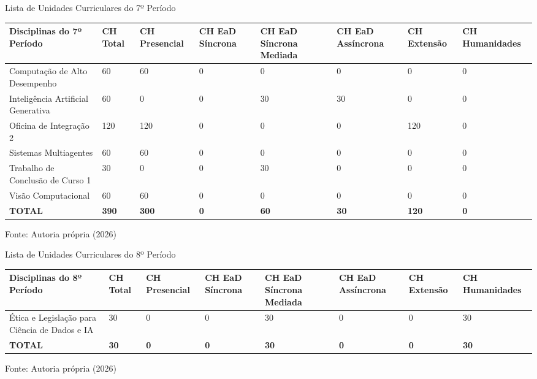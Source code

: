 \begin{quadro}[ht!]
\centering
\caption{Lista de Unidades Curriculares do 7º Período}
\label{quadro2.7}
\small
\begin{tabular}{|p{4.2cm}|p{1.2cm}|p{1.2cm}|p{1.2cm}|p{1.2cm}|p{1.2cm}|p{1.2cm}|p{1.2cm}|}
\hline
\rowcolor{gray!10} \textbf{Disciplinas do 7º Período} & \textbf{CH Total} & \textbf{CH Presencial} & \textbf{CH EaD Síncrona} & \textbf{CH EaD Síncrona Mediada} & \textbf{CH EaD Assíncrona} & \textbf{CH Extensão} & \textbf{CH Humanidades} \\ \hline
Computação de Alto Desempenho & 60 & 60 & 0 & 0 & 0 & 0 & 0 \\ \hline
Inteligência Artificial Generativa & 60 & 0 & 0 & 30 & 30 & 0 & 0 \\ \hline
Oficina de Integração 2 & 120 & 120 & 0 & 0 & 0 & 120 & 0 \\ \hline
Sistemas Multiagentes & 60 & 60 & 0 & 0 & 0 & 0 & 0 \\ \hline
Trabalho de Conclusão de Curso 1 & 30 & 0 & 0 & 30 & 0 & 0 & 0 \\ \hline
Visão Computacional & 60 & 60 & 0 & 0 & 0 & 0 & 0 \\ \hline
\rowcolor{gray!20} \textbf{TOTAL} & \textbf{390} & \textbf{300} & \textbf{0} & \textbf{60} & \textbf{30} & \textbf{120} & \textbf{0} \\ \hline
\end{tabular}
\par\vspace{2pt}
\footnotesize{Fonte: Autoria própria (2026)}
\end{quadro}

\begin{quadro}[ht!]
\centering
\caption{Lista de Unidades Curriculares do 8º Período}
\label{quadro2.8}
\small
\begin{tabular}{|p{4.2cm}|p{1.2cm}|p{1.2cm}|p{1.2cm}|p{1.2cm}|p{1.2cm}|p{1.2cm}|p{1.2cm}|}
\hline
\rowcolor{gray!10} \textbf{Disciplinas do 8º Período} & \textbf{CH Total} & \textbf{CH Presencial} & \textbf{CH EaD Síncrona} & \textbf{CH EaD Síncrona Mediada} & \textbf{CH EaD Assíncrona} & \textbf{CH Extensão} & \textbf{CH Humanidades} \\ \hline
Ética e Legislação para Ciência de Dados e IA & 30 & 0 & 0 & 30 & 0 & 0 & 30 \\ \hline
\rowcolor{gray!20} \textbf{TOTAL} & \textbf{30} & \textbf{0} & \textbf{0} & \textbf{30} & \textbf{0} & \textbf{0} & \textbf{30} \\ \hline
\end{tabular}
\par\vspace{2pt}
\footnotesize{Fonte: Autoria própria (2026)}
\end{quadro}

